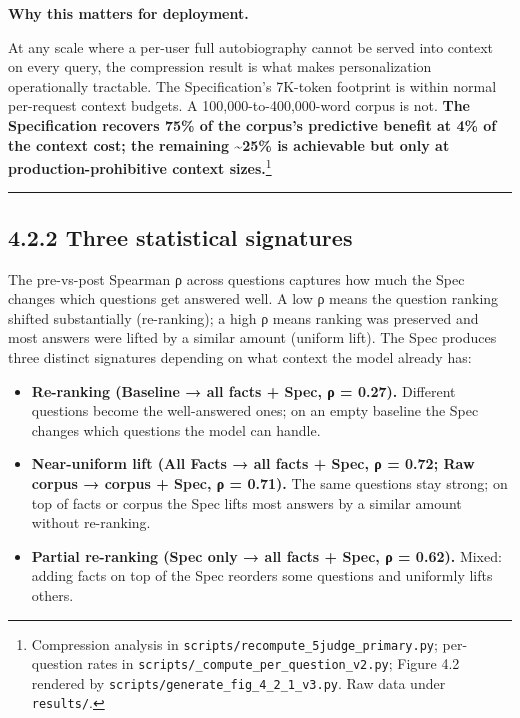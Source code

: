 \textbf{Why this matters for deployment.}

At any scale where a per-user full autobiography cannot be served into
context on every query, the compression result is what makes
personalization operationally tractable. The Specification's 7K-token
footprint is within normal per-request context budgets. A
100,000-to-400,000-word corpus is not. \textbf{The Specification
recovers 75\% of the corpus's predictive benefit at 4\% of the context
cost; the remaining \textasciitilde25\% is achievable but only at
production-prohibitive context sizes.}\footnote{Compression analysis in
  \texttt{scripts/recompute\_5judge\_primary.py}; per-question rates in
  \texttt{scripts/\_compute\_per\_question\_v2.py}; Figure 4.2 rendered
  by \texttt{scripts/generate\_fig\_4\_2\_1\_v3.py}. Raw data under
  \texttt{results/}.}

\begin{center}\rule{0.5\linewidth}{0.5pt}\end{center}

\hypertarget{three-statistical-signatures}{%
\subsection{4.2.2 Three statistical
signatures}\label{three-statistical-signatures}}

The pre-vs-post Spearman ρ across questions captures how much the Spec
changes which questions get answered well. A low ρ means the question
ranking shifted substantially (re-ranking); a high ρ means ranking was
preserved and most answers were lifted by a similar amount (uniform
lift). The Spec produces three distinct signatures depending on what
context the model already has:

\begin{itemize}
\tightlist
\item
  \textbf{Re-ranking (Baseline → all facts + Spec, ρ = 0.27).} Different
  questions become the well-answered ones; on an empty baseline the Spec
  changes which questions the model can handle.
\item
  \textbf{Near-uniform lift (All Facts → all facts + Spec, ρ = 0.72; Raw
  corpus → corpus + Spec, ρ = 0.71).} The same questions stay strong; on
  top of facts or corpus the Spec lifts most answers by a similar amount
  without re-ranking.
\item
  \textbf{Partial re-ranking (Spec only → all facts + Spec, ρ = 0.62).}
  Mixed: adding facts on top of the Spec reorders some questions and
  uniformly lifts others.
\end{itemize}

